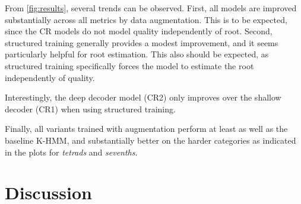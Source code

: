 \documentclass{article}
\begin{document}
From \cref{fig:results}, several trends can be observed.
First, all models are improved substantially across all metrics by data augmentation.  This is to be expected, since the CR models do not model quality independently of root.
Second, structured training generally provides a modest improvement, and it seems particularly helpful for root estimation.
This also should be expected, as structured training specifically forces the model to estimate the root independently of quality.

Interestingly, the deep decoder model (CR2) only improves over the shallow decoder (CR1) when using structured training.

Finally, all variants trained with augmentation perform at least as well as the baseline K-HMM, and substantially better on the harder categories as indicated in the plots for \emph{tetrads} and \emph{sevenths}.
\section{Discussion}




\end{document}
